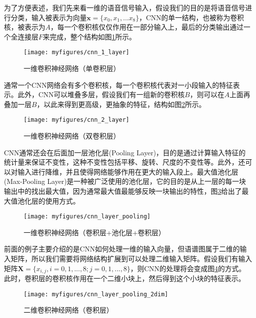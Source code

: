 为了方便表述，我们先来看一维的语音信号输入，假设我们的目的是将语音信号进行分类，输入被表示为向量$\mathbf{x}=\{x_0,x_1,...x_8\}$，CNN的单一结构，也被称为卷积核，被表示为$A$，每一个卷积核仅仅作用在一部分输入上，最后的分类输出通过一个全连接层$F$来完成，整个结构如图\ref{fig:cnn_1_layer}所示。

\begin{figure}[htb] %
    \centering
    \texttt{[image: myfigures/cnn\_1\_layer]}
    \caption{一维卷积神经网络（单卷积层）}
    \label{fig:cnn_1_layer}
\end{figure}

通常一个CNN网络会有多个卷积核，每一个卷积核代表对一小段输入的特征表示。此外，CNN可以堆叠多层，假设我们有一组新的卷积核$B$，则可以在$A$上面再叠加一层$B$，以此来得到更高级，更抽象的特征，结构如图\ref{fig:cnn_2_layer}所示。

\begin{figure}[htb] %
    \centering
    \texttt{[image: myfigures/cnn\_2\_layer]}
    \caption{一维卷积神经网络（双卷积层）}
    \label{fig:cnn_2_layer}
\end{figure}

CNN通常还会在后面加一层池化层(Pooling Layer)，目的是通过计算输入特征的统计量来保证不变性，这种不变性包括平移、旋转、尺度的不变性等。此外，还可以对输入进行降维，并且使得网络能够作用在更大的输入段上。最大值池化层(Max-Pooling Layer)是一种被广泛使用的池化层，它的目的是从上一层的每一块输出中的找出最大值，因为通常最大值最能够反映一块输出的特性，图\ref{fig:cnn_layer_pooling}给出了最大值池化层的使用方式。

\begin{figure}[htb] %
    \centering
    \texttt{[image: myfigures/cnn\_layer\_pooling]}
    \caption{一维卷积神经网络（卷积层+池化层+卷积层）}
    \label{fig:cnn_layer_pooling}
\end{figure}

前面的例子主要介绍的是CNN如何处理一维的输入向量，但语谱图属于二维的输入矩阵，所以我们需要将网络结构扩展到可以处理二维输入矩阵。假设我们有输入矩阵$\mathbf{X}=\{x_{i,j}, i=0,1,...,8; j=0,1,...,8\}$，则CNN的处理将会变成图\ref{fig:cnn_layer_pooling_2dim}的方式。此时，卷积层的卷积核作用在一个二维小块上，然后得到这个小块的特征表示。

\begin{figure}[htb] %
    \centering
    \texttt{[image: myfigures/cnn\_layer\_pooling\_2dim]}
    \caption{二维卷积神经网络（卷积层）}
    \label{fig:cnn_layer_pooling_2dim}
\end{figure}

